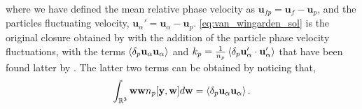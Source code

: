 where we have defined the mean relative phase velocity as $\textbf{u}_{fp} = \textbf{u}_f - \textbf{u}_p$, and the particles fluctuating velocity, $\textbf{u}_\alpha' = \textbf{u}_\alpha - \textbf{u}_p$. 
\ref{eq:van_wingarden_sol} is the original closure obtained by \citet{van1998pseudo} with the addition of the particle phase velocity fluctuations, with the terms $\left<\delta_p \textbf{u}_\alpha\textbf{u}_\alpha\right>$ and $k_p = \frac{1}{n_p}\left<\delta_p \textbf{u}_\alpha'\cdot\textbf{u}_\alpha'\right>$ that have been found latter by \citet[Appendix B]{zhang1994averaged}. 
The latter two terms can be obtained by noticing that, 
\begin{equation}
    \int_{\mathbb{R}^3} \textbf{ww} n_p[\textbf{y},\textbf{w}] d\textbf{w}
    = \left<\delta_p \textbf{u}_\alpha\textbf{u}_\alpha\right>. 
\end{equation}


